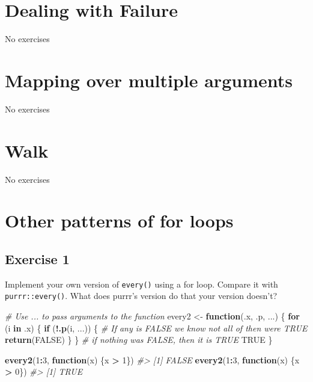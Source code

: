 \documentclass[]{book}
\newenvironment{Shaded}{\begin{snugshade}}{\end{snugshade}}
\newcommand{\CommentTok}[1]{\textcolor[rgb]{0.56,0.35,0.01}{\textit{#1}}}
\newcommand{\ControlFlowTok}[1]{\textcolor[rgb]{0.13,0.29,0.53}{\textbf{#1}}}
\newcommand{\DecValTok}[1]{\textcolor[rgb]{0.00,0.00,0.81}{#1}}
\newcommand{\KeywordTok}[1]{\textcolor[rgb]{0.13,0.29,0.53}{\textbf{#1}}}
\newcommand{\NormalTok}[1]{#1}
\newcommand{\OperatorTok}[1]{\textcolor[rgb]{0.81,0.36,0.00}{\textbf{#1}}}
\newcommand{\OtherTok}[1]{\textcolor[rgb]{0.56,0.35,0.01}{#1}}
\newcommand{\StringTok}[1]{\textcolor[rgb]{0.31,0.60,0.02}{#1}}
\theoremstyle{definition}
\theoremstyle{definition}
\theoremstyle{definition}
\theoremstyle{remark}
\begin{document}
\hypertarget{dealing-with-failure}{%
\section{Dealing with Failure}\label{dealing-with-failure}}

No exercises

\hypertarget{mapping-over-multiple-arguments}{%
\section{Mapping over multiple
arguments}\label{mapping-over-multiple-arguments}}

No exercises

\hypertarget{walk}{%
\section{Walk}\label{walk}}

No exercises

\hypertarget{other-patterns-of-for-loops}{%
\section{Other patterns of for
loops}\label{other-patterns-of-for-loops}}

\hypertarget{exercise-1-56}{%
\subsection{Exercise 1}\label{exercise-1-56}}

Implement your own version of \texttt{every()} using a for loop. Compare
it with \texttt{purrr::every()}. What does purrr's version do that your
version doesn't?

\begin{Shaded}
\begin{Highlighting}[]
\CommentTok{# Use ... to pass arguments to the function}
\NormalTok{every2 <-}\StringTok{ }\ControlFlowTok{function}\NormalTok{(.x, .p, ...) \{}
  \ControlFlowTok{for}\NormalTok{ (i }\ControlFlowTok{in}\NormalTok{ .x) \{}
    \ControlFlowTok{if}\NormalTok{ (}\OperatorTok{!}\KeywordTok{.p}\NormalTok{(i, ...)) \{}
      \CommentTok{# If any is FALSE we know not all of then were TRUE}
      \KeywordTok{return}\NormalTok{(}\OtherTok{FALSE}\NormalTok{)}
\NormalTok{    \}}
\NormalTok{  \}}
  \CommentTok{# if nothing was FALSE, then it is TRUE}
  \OtherTok{TRUE}  
\NormalTok{\}}

\KeywordTok{every2}\NormalTok{(}\DecValTok{1}\OperatorTok{:}\DecValTok{3}\NormalTok{, }\ControlFlowTok{function}\NormalTok{(x) \{x }\OperatorTok{>}\StringTok{ }\DecValTok{1}\NormalTok{\})}
\CommentTok{#> [1] FALSE}
\KeywordTok{every2}\NormalTok{(}\DecValTok{1}\OperatorTok{:}\DecValTok{3}\NormalTok{, }\ControlFlowTok{function}\NormalTok{(x) \{x }\OperatorTok{>}\StringTok{ }\DecValTok{0}\NormalTok{\})}
\CommentTok{#> [1] TRUE}
\end{Highlighting}
\end{Shaded}
\end{document}
